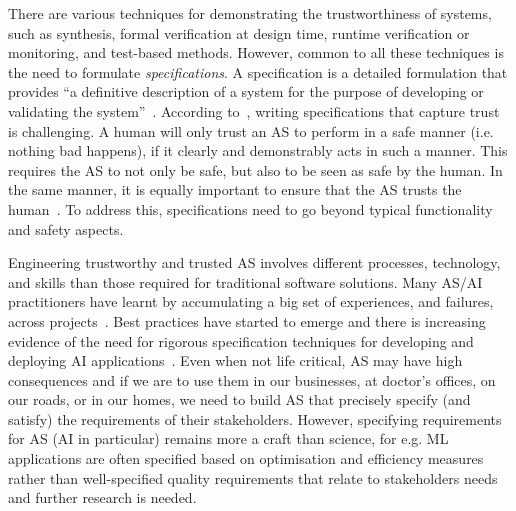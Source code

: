 \documentclass[sigconf,nonacm]{acmart}%
\begin{document}
	There are various techniques for demonstrating the trustworthiness of systems, such as synthesis, formal verification at design time, runtime verification or monitoring, and test-based methods. 
	However, common to all these techniques is the need to formulate \emph{specifications}. 
	A specification is a detailed formulation that provides ``a definitive description of a system for the purpose of developing or validating the system''~\cite{ISO24765:2017}.
	According to~\cite{Kress-Gazit2021}, writing specifications that capture trust is challenging. A human will only trust an AS to perform in a safe manner (i.e. nothing bad happens), if it clearly and demonstrably acts in such a manner. This requires the AS to not only be safe, but also to be seen as safe by the human. In the same manner, it is equally important to ensure that the AS trusts the human~\cite{Kress-Gazit2021}. To address this, specifications need to go beyond typical functionality and safety aspects.

	Engineering trustworthy and trusted AS involves different processes, technology, and skills than those required for traditional software solutions. Many AS/AI practitioners have learnt by accumulating a big set of experiences, and failures, across projects~\cite{AmershiBBDGKNN019}. Best practices have started to emerge and there is increasing evidence of the need for rigorous specification techniques for developing and deploying AI applications~\cite{damour2020}. Even when not life critical, AS may have high consequences and if we are to use them in our businesses, at doctor’s offices, on our roads, or in our homes, we need to build AS that precisely specify (and satisfy) the requirements of their stakeholders. However, specifying requirements for AS (AI in particular) remains more a craft than science, for e.g. ML applications are often specified based on optimisation and efficiency measures rather than well-specified quality requirements that relate to stakeholders needs~\cite{IshikawaM20} and further research is needed.		
\end{document}
